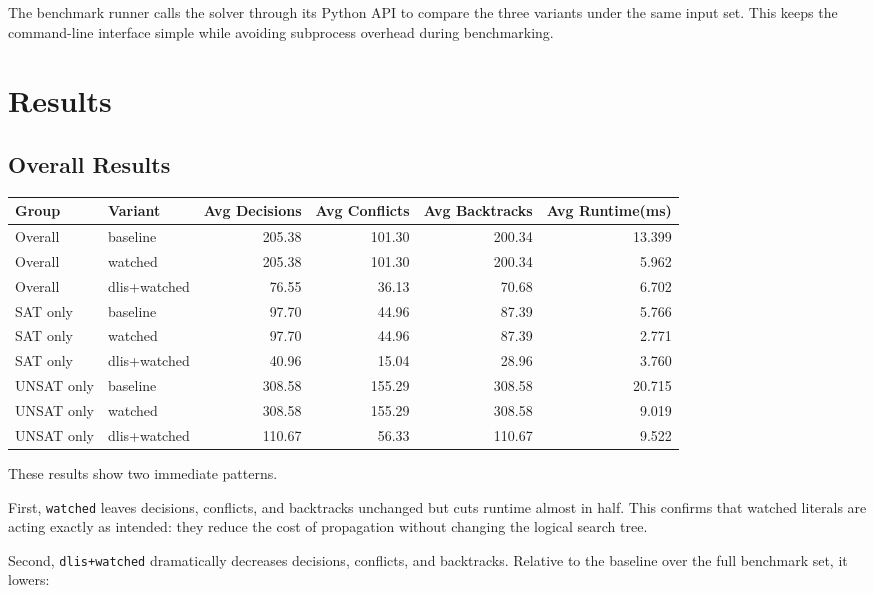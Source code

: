 \documentclass[11pt]{article}
\begin{document}
The benchmark runner calls the solver through its Python API to compare the
three variants under the same input set. This keeps the command-line interface
simple while avoiding subprocess overhead during benchmarking.

\section{Results}

\subsection{Overall Results}

\begin{center}
\small
\renewcommand{\arraystretch}{1.08}
\begin{tabular}{|l|l|r|r|r|r|}
\hline
\textbf{Group} & \textbf{Variant} & \textbf{Avg Decisions} & \textbf{Avg Conflicts} & \textbf{Avg Backtracks} & \textbf{Avg Runtime(ms)} \\
\hline
Overall & baseline & 205.38 & 101.30 & 200.34 & 13.399 \\
Overall & watched & 205.38 & 101.30 & 200.34 & 5.962 \\
Overall & dlis+watched & 76.55 & 36.13 & 70.68 & 6.702 \\
\hline
SAT only & baseline & 97.70 & 44.96 & 87.39 & 5.766 \\
SAT only & watched & 97.70 & 44.96 & 87.39 & 2.771 \\
SAT only & dlis+watched & 40.96 & 15.04 & 28.96 & 3.760 \\
\hline
UNSAT only & baseline & 308.58 & 155.29 & 308.58 & 20.715 \\
UNSAT only & watched & 308.58 & 155.29 & 308.58 & 9.019 \\
UNSAT only & dlis+watched & 110.67 & 56.33 & 110.67 & 9.522 \\
\hline
\end{tabular}
\end{center}

These results show two immediate patterns.

First, \texttt{watched} leaves decisions, conflicts, and backtracks unchanged
but cuts runtime almost in half. This confirms that watched literals are acting
exactly as intended: they reduce the cost of propagation without changing the
logical search tree.

Second, \texttt{dlis+watched} dramatically decreases decisions, conflicts, and
backtracks. Relative to the baseline over the full benchmark set, it lowers:
\end{document}
